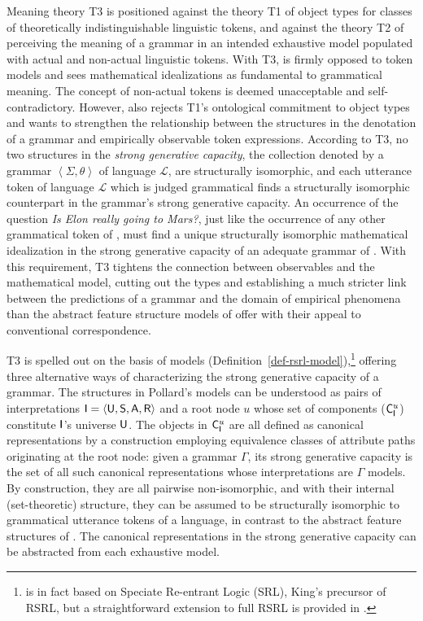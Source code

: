 \documentclass[output=paper
 	        ,biblatex
                ,babelshorthands
                ,newtxmath
                ,draftmode
                ,colorlinks, citecolor=brown
]{langscibook}
\begin{document}
{Meaning theory T3 is positioned against the theory T1 of object types
for classes of theoretically indistinguishable linguistic tokens, and
against the theory T2 of perceiving the meaning of a grammar in an
intended exhaustive model populated with actual and non-actual
linguistic tokens.  With T3, \citet{Pollard99a} is firmly opposed to
token models and sees mathematical idealizations as fundamental to
grammatical meaning.  The concept of non-actual tokens is deemed
unacceptable and self-contradictory. However, \citet{Pollard99a} also
rejects T1's ontological commitment to object types and wants to
strengthen the relationship between the structures in the denotation
of a grammar and empirically observable token expressions.  According
to T3, no two structures in the \emph{strong generative capacity}, the
collection denoted by a grammar $\left< \Sigma, \theta\right>$ of
language $\mathcal{L}$, are
structurally isomorphic, and each utterance token of language
$\mathcal{L}$ which is judged grammatical finds a structurally
isomorphic counterpart in the grammar's strong generative capacity.
An occurrence of the question \emph{Is Elon really going to Mars?}, just
like the occurrence of any other grammatical token of , must
find a unique structurally isomorphic mathematical idealization in the
strong generative capacity of an
adequate grammar of . With this requirement, T3 tightens the
connection between observables and the mathematical model, cutting out
the types and establishing a much stricter link between the
predictions of a grammar and the domain of empirical phenomena than
the abstract feature structure models of  offer
with their appeal to conventional correspondence.

T3 is spelled out on the basis of models
(Definition~\ref{def-rsrl-model}),\footnote{ is in
  fact based on Speciate Re-entrant Logic (SRL), King's precursor of
  RSRL, but a straightforward extension to full RSRL is provided in
  .} offering three alternative ways of
characterizing the strong generative capacity of a grammar. The
structures in Pollard's models can be understood as pairs of
interpretations $\mathsf{I}=\langle\mathsf{U},\mathsf{S},\mathsf{A},\mathsf{R}\rangle$ and a root node $u$ whose set
of components ($\mathsf{C}_{\mathsf{I}}^u$) constitute $\mathsf{I}$'s universe
$\mathsf{U}$. The objects in $\mathsf{C}_{\mathsf{I}}^u$ are all defined as
canonical representations by a construction employing equivalence
classes of attribute paths originating at the root node: given a
grammar $\Gamma$, its strong generative capacity is the set of all
such canonical representations whose interpretations are $\Gamma$
models. By construction, they are all pairwise non-isomorphic, and
with their internal (set-theoretic) structure, they can be assumed to
be structurally isomorphic to grammatical utterance tokens of a
language, in contrast to the abstract feature structures of
. The canonical representations in the strong
generative capacity can be abstracted from each exhaustive model.



}
\end{document}
